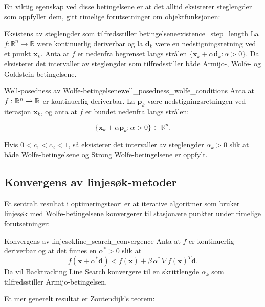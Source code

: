 En viktig egenskap ved disse betingelsene er at det alltid eksisterer steglengder som oppfyller dem, gitt rimelige forutsetninger om objektfunksjonen:

\begin{theorem}{Eksistens av steglengder som tilfredsstiller betingelsene}{existence_step_length}
	La $f: \mathbb{R}^n \to \mathbb{R}$ være kontinuerlig deriverbar og la $\symbf{d}_k$ være en nedstigningsretning ved et punkt $\symbf{x}_k$. Anta at $f$ er nedenfra begrenset langs strålen $\{\symbf{x}_k + \alpha\symbf{d}_k : \alpha > 0\}$. Da eksisterer det intervaller av steglengder som tilfredsstiller både Armijo-, Wolfe- og Goldstein-betingelsene.
\end{theorem}

\begin{lemma}{Well-posedness av Wolfe-betingelsene}{well_posedness_wolfe_conditions}
	Anta at \(f:\mathbb{R}^n \to \mathbb{R} \) er kontinuerlig deriverbar. La \(\mathbf{p}_k\) være nedstigningsretningen ved iterasjon \(\mathbf{x}_k\), og anta at \(f\) er bundet nedenfra langs strålen:

	\[
		\{\mathbf{x}_k + \alpha \mathbf{p}_k : \alpha > 0\} \subset \mathbb{R}^n.
	\]

	Hvis \(0 < c_1 < c_2 < 1\), så eksisterer det intervaller av steglengder \(\alpha_k > 0\) slik at både Wolfe-betingelsene og Strong Wolfe-betingelsene er oppfylt.
\end{lemma}

\subsection{Konvergens av linjesøk-metoder}
\label{subsec:convergence_line_search}

Et sentralt resultat i optimeringsteori er at iterative algoritmer som bruker linjesøk med Wolfe-betingelsene konvergerer til stasjonære punkter under rimelige forutsetninger:

\begin{theorem}{Konvergens av linjesøk}{line_search_convergence}
	Anta at \(f\) er kontinuerlig deriverbar og at det finnes en \(\alpha^\ast > 0\) slik at
	\[
		f(\symbf{x} + \alpha^\ast \symbf{d}) < f(\symbf{x}) + \beta\,\alpha^\ast\,\nabla f(\symbf{x})^T \symbf{d}.
	\]
	Da vil Backtracking Line Search konvergere til en skrittlengde \(\alpha_k\) som tilfredsstiller Armijo-betingelsen.
\end{theorem}

Et mer generelt resultat er Zoutendijk's teorem:

